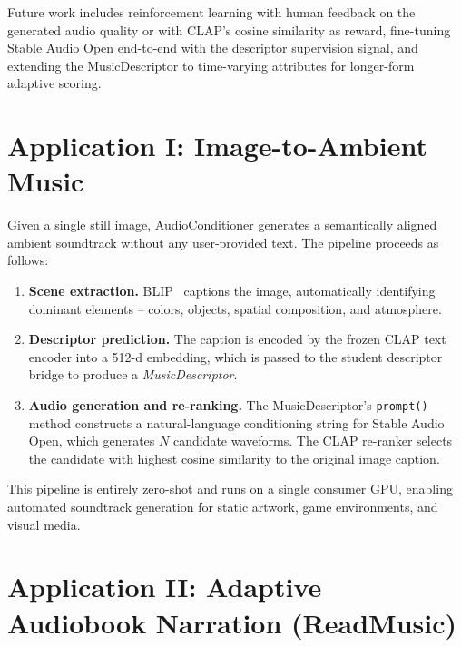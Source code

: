 \documentclass[10pt,twocolumn,letterpaper]{article}
\begin{document}
Future work includes reinforcement learning with human feedback on the
generated audio quality or with CLAP's cosine similarity as reward, fine-tuning Stable Audio Open end-to-end with the descriptor supervision signal, and extending the MusicDescriptor to time-varying attributes for longer-form adaptive scoring.

{
  \small
  
  
}

\appendix

\section{Application I: Image-to-Ambient Music}
\label{app:image_music}

Given a single still image, AudioConditioner generates a semantically aligned ambient soundtrack without any user-provided text.
The pipeline proceeds as follows:

\begin{enumerate}
  \item \textbf{Scene extraction.} BLIP~\cite{li2022blip} captions the image, automatically identifying dominant elements -- colors, objects, spatial composition, and atmosphere.
  \item \textbf{Descriptor prediction.} The caption is encoded by the frozen CLAP text encoder into a 512-d embedding, which is passed to the student descriptor bridge to produce a \emph{MusicDescriptor}.
  \item \textbf{Audio generation and re-ranking.} The MusicDescriptor's \texttt{prompt()} method constructs a natural-language conditioning string for Stable Audio Open, which generates $N$ candidate waveforms. The CLAP re-ranker selects the candidate with highest cosine similarity to the original image caption.
\end{enumerate}

This pipeline is entirely zero-shot and runs on a single consumer GPU, enabling automated soundtrack generation for static artwork, game environments, and visual media.

\section{Application II: Adaptive Audiobook Narration (ReadMusic)}
\label{app:readmusic}
\end{document}
